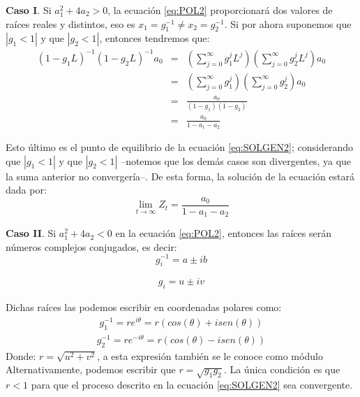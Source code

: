 \documentclass[
]{book}
\begin{document}
\textbf{Caso I}. Si \(a^2_1 + 4 a_2 > 0\), la ecuación \eqref{eq:POL2} proporcionará dos valores de raíces reales y distintos, eso es \(x_1 = g^{-1}_1 \neq x_2 = g^{-1}_2\). Si por ahora suponemos que \(|{g_1} < 1|\) y que \(|{g_2} < 1|\), entonces tendremos que:
\begin{eqnarray}
    (1 - g_1 L)^{-1} (1 - g_2 L)^{-1} a_0 & =&  \left( \sum^{\infty}_{j = 0}{g^j_1 L^j} \right) \left( \sum^{\infty}_{j = 0}{g^j_2 L^j} \right) a_0 \nonumber \\
    & = & \left( \sum^{\infty}_{j = 0}{g^j_1} \right) \left( \sum^{\infty}_{j = 0}{g^j_2} \right) a_0 \nonumber \\
    & = & \frac{a_0}{(1 - g_1)(1 - g_2)} \nonumber \\
    & = & \frac{a_0}{1 - a_1 - a_2}
    \label{eq:eqcaracteristica6}
\end{eqnarray}

Esto último es el punto de equilibrio de la ecuación \eqref{eq:SOLGEN2}; considerando que \(|{g_1} < 1|\) y que \(|{g_2} < 1|\) --notemos que los demás casos son divergentes, ya que la suma anterior no convergería--. De esta forma, la solución de la ecuación estará dada por:
\begin{equation}
    \lim_{t \to \infty} Z_t = \frac{a_0}{1 - a_1 - a_2}
    \label{eq:Conver}
\end{equation}

\textbf{Caso II}. Si \(a_1^2 + 4a_2 < 0\) en la ecuación \eqref{eq:POL2}, entonces las raíces serán números complejos conjugados, es decir:
\begin{equation}
g_i^{-1}=a \pm ib
\label{eq:Conver1}
\end{equation}

\begin{eqnarray}
    g_i  =  u \pm iv 
    \label{eq:Conver2}
\end{eqnarray}

Dichas raíces las podemos escribir en coordenadas polares como:
\begin{eqnarray}
    g_1^{-1} = r e^{i \theta} = r (cos(\theta) + i sen(\theta))
    \label{eq:Conver3}
\end{eqnarray}
\begin{eqnarray}
    g_2^{-1}  =  r e^{-i \theta} = r (cos(\theta) - i sen(\theta))
    \label{eq:Conver4}
\end{eqnarray}
Donde: \(r = \sqrt{u^2 + v^2}\), a esta expresión también se le conoce como módulo Alternativamente, podemos escribir que \(r = \sqrt{g_1 g_2}\). La única condición es que \(r < 1\) para que el proceso descrito en la ecuación \eqref{eq:SOLGEN2} sea convergente.
\end{document}

